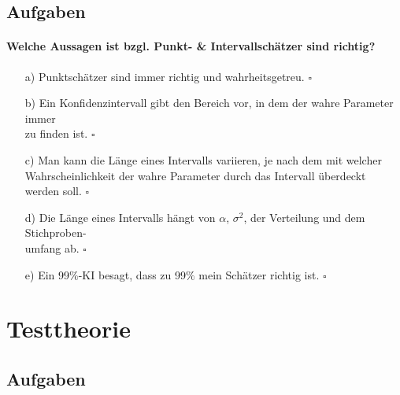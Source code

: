 \documentclass[a4paper]{article}
\begin{document}
\subsection{Aufgaben}
\paragraph{Welche Aussagen ist bzgl. Punkt- \& Intervallschätzer sind richtig?}
\begin{itemize}
    \item[a)] Punktschätzer sind immer richtig und wahrheitsgetreu. \hfill $\square$
    \item[b)] Ein Konfidenzintervall gibt den Bereich vor, in dem der wahre Parameter immer \\zu finden ist. \hfill $\square$
    \item[c)] Man kann die Länge eines Intervalls variieren, je nach dem mit welcher\\ Wahrscheinlichkeit der wahre Parameter durch das Intervall überdeckt werden soll. \hfill $\square$
    \item[d)] Die Länge eines Intervalls hängt von $\alpha$, $\sigma^2$, der Verteilung und dem Stichproben-\\umfang ab. \hfill $\square$
    \item[e)] Ein 99$\%$-KI besagt, dass zu 99$\%$ mein Schätzer richtig ist. \hfill $\square$
\end{itemize}


\clearpage


\section{Testtheorie}\label{sec:Tests}

\subsection{Aufgaben}
\end{document}

